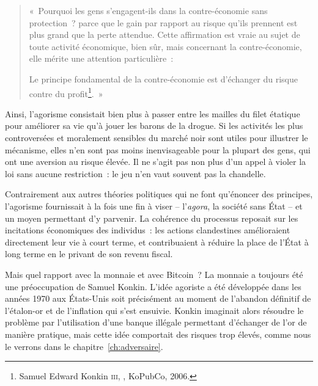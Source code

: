 \begin{quote}
«~Pourquoi les gens s'engagent-ils dans la contre-économie sans protection~? parce que le gain par rapport au risque qu'ils prennent est plus grand que la perte attendue. Cette affirmation est vraie au sujet de toute activité économique, bien sûr, mais concernant la contre-économie, elle mérite une attention particulière~:

Le principe fondamental de la contre-économie est d'échanger du risque contre du profit\footnote{Samuel Edward Konkin \textsc{iii}, , KoPubCo, 2006.}.~»
\end{quote} %

Ainsi, l'agorisme consistait bien plus à passer entre les mailles du filet étatique pour améliorer sa vie qu'à jouer les barons de la drogue. Si les activités les plus controversées et moralement sensibles du marché noir sont utiles pour illustrer le mécanisme, elles n'en sont pas moins inenvisageable pour la plupart des gens, qui ont une aversion au risque élevée. Il ne s'agit pas non plus d'un appel à violer la loi sans aucune restriction~: le jeu n'en vaut souvent pas la chandelle.

\clearpage
Contrairement aux autres théories politiques qui ne font qu'énoncer des principes, l'agorisme fournissait à la fois une fin à viser -- l'\emph{agora}, la société sans État -- et un moyen permettant d'y parvenir. La cohérence du processus reposait sur les incitations économiques des individus~: les actions clandestines amélioraient directement leur vie à court terme, et contribuaient à réduire la place de l'État à long terme en le privant de son revenu fiscal.


Mais quel rapport avec la monnaie et avec Bitcoin~? La monnaie a toujours été une préoccupation de Samuel Konkin. L'idée agoriste a été développée dans les années 1970 aux États-Unis soit précisément au moment de l'abandon définitif de l'étalon-or et de l'inflation qui s'est ensuivie. Konkin imaginait alors résoudre le problème par l'utilisation d'une banque illégale permettant d'échanger de l'or de manière pratique, mais cette idée comportait des risques trop élevés, comme nous le verrons dans le chapitre~\ref{ch:adversaire}.

